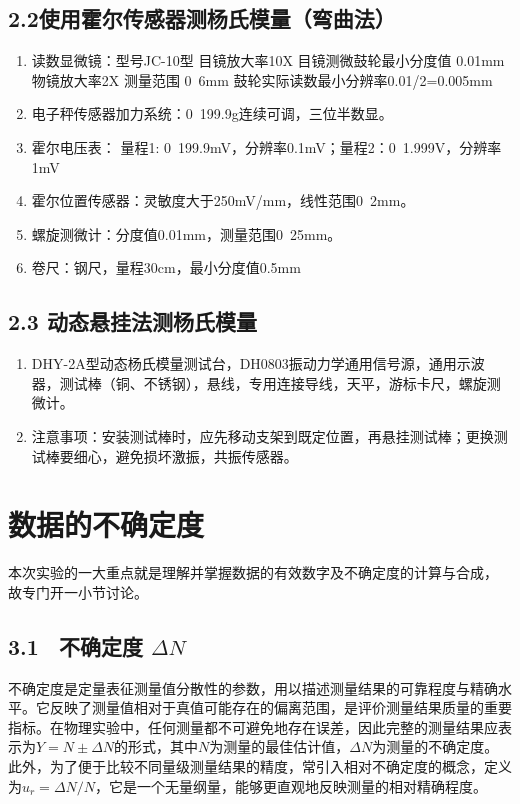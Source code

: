 \documentclass[11pt]{article}
\begin{document}
\subsection*{2.2使用霍尔传感器测杨氏模量（弯曲法）}
\begin{enumerate}
    \item 读数显微镜：型号JC-10型 目镜放大率10X 目镜测微鼓轮最小分度值 0.01mm 物镜放大率2X 测量范围 0~6mm 鼓轮实际读数最小分辨率0.01/2=0.005mm 
    \item 电子秤传感器加力系统：0~199.9g连续可调，三位半数显。
    \item 霍尔电压表： 量程1:   0~199.9mV，分辨率0.1mV；量程2：0~1.999V，分辨率1mV
    \item 霍尔位置传感器：灵敏度大于250mV/mm，线性范围0~2mm。
    \item 螺旋测微计：分度值0.01mm，测量范围0~25mm。
    \item 卷尺：钢尺，量程30cm，最小分度值0.5mm
\end{enumerate}
\subsection*{2.3 动态悬挂法测杨氏模量}
\begin{enumerate}
    \item DHY-2A型动态杨氏模量测试台，DH0803振动力学通用信号源，通用示波器，测试棒（铜、不锈钢），悬线，专用连接导线，天平，游标卡尺，螺旋测微计。
    \item 注意事项：安装测试棒时，应先移动支架到既定位置，再悬挂测试棒；更换测试棒要细心，避免损坏激振，共振传感器。
\end{enumerate}

\section{数据的不确定度}

本次实验的一大重点就是理解并掌握数据的有效数字及不确定度的计算与合成，
故专门开一小节讨论。

\subsection*{3.1 \ 不确定度 $\Delta N$}

不确定度是定量表征测量值分散性的参数，用以描述测量结果的可靠程度与精确水平。它反映了测量值相对于真值可能存在的偏离范围，是评价测量结果质量的重要指标。在物理实验中，任何测量都不可避免地存在误差，因此完整的测量结果应表示为$Y=N\pm\Delta N$的形式，其中$N$为测量的最佳估计值，$\Delta N$为测量的不确定度。此外，为了便于比较不同量级测量结果的精度，常引入相对不确定度的概念，定义为$u_r=\Delta N/N$，它是一个无量纲量，能够更直观地反映测量的相对精确程度。
\end{document}
